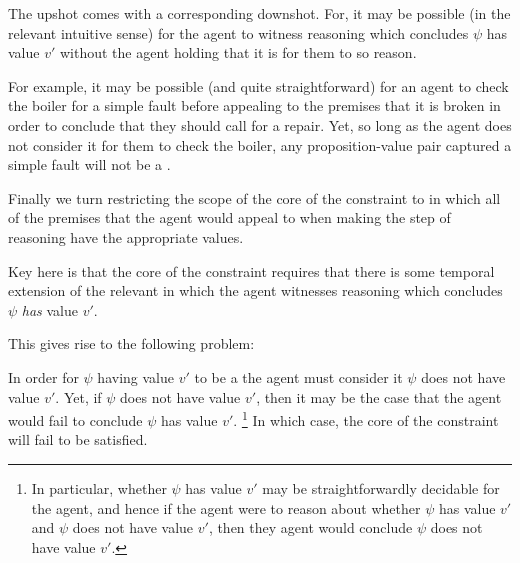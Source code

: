 \begin{note}
  The upshot comes with a corresponding downshot.
  For, it may be possible (in the relevant intuitive sense) for the agent to witness reasoning which concludes \(\psi\) has value \(v'\) without the agent holding that it is \epVAd{} for them to so reason.

  For example, it may be possible (and quite straightforward) for an agent to check the boiler for a simple fault before appealing to the premises that it is broken in order to conclude that they should call for a repair.
  Yet, so long as the agent does not consider it \epVAd{} for them to check the boiler, any proposition-value pair captured a simple fault will not be a \prequ{}.
\end{note}


\begin{note}
  Finally we turn restricting the scope of the core of the constraint to  in which all of the premises that the agent would appeal to when making the step of reasoning have the appropriate values.

  Key here is that the core of the constraint requires that there is some temporal extension of the relevant  in which the agent witnesses reasoning which concludes \(\psi\) \emph{has} value \(v'\).

  This gives rise to the following problem:
\end{note}

\begin{note}[Problem]
  In order for \(\psi\) having value \(v'\) to be a \crequ{} the agent must consider it \epVAd{} \(\psi\) does not have value \(v'\).
  Yet, if \(\psi\) does not have value \(v'\), then it may be the case that the agent would fail to conclude \(\psi\) has value \(v'\).\nolinebreak
  \footnote{
    In particular, whether \(\psi\) has value \(v'\) may be straightforwardly decidable for the agent, and hence if the agent were to reason about whether \(\psi\) has value \(v'\) and \(\psi\) does not have value \(v'\), then they agent would conclude \(\psi\) does not have value \(v'\).
  }
  In which case, the core of the constraint will fail to be satisfied.
\end{note}

